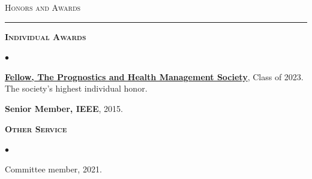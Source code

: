 \textsc{\Large{Honors and Awards}} %
\vspace{3pt}
\hrule
\vspace{3pt}

\begin{list}{}{\leftmargin=0in}

\item \textsc{\textbf{Individual Awards}}

\begin{list}{$\bullet$}{ \topsep -0.1in \itemsep -0.01in}
    \item \textbf{\href{https://phmsociety.org/x/}{Fellow, The Prognostics and Health Management Society}}, Class of 2023. The society's highest individual honor.
    \item \textbf{Senior Member, IEEE}, 2015.
\end{list}

\item \textbf{\textsc{Other Service}}
\begin{list}{$\bullet$}{}
    \item Committee member, 2021.
\end{list}

\end{list}

